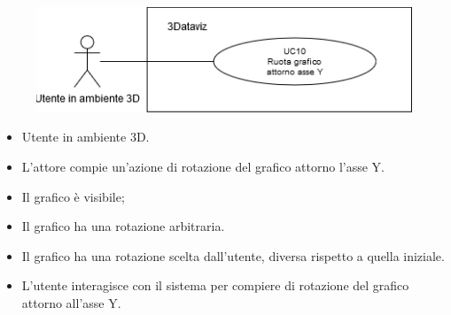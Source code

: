 \begin{figure}[h!]
    \centering
    \includegraphics[scale=0.65]{template/images/UC10.png}
    \caption{}
\end{figure}
\UCdsc
{ %
    \begin{itemize}
        \item Utente in ambiente 3D.
    \end{itemize}
}
{ %
    \begin{itemize}
        \item L'attore compie un'azione di rotazione del grafico attorno l'asse Y.
    \end{itemize}
}
{ %
    \begin{itemize}
        \item Il grafico è visibile;
        \item Il grafico ha una rotazione arbitraria.
    \end{itemize}
}
{ %
    \begin{itemize}
        \item Il grafico ha una rotazione scelta dall'utente, diversa rispetto a quella iniziale.
    \end{itemize}
}
{ %
    \begin{itemize}
        \item L'utente interagisce con il sistema per compiere di rotazione del grafico attorno all'asse Y.
    \end{itemize}
}

